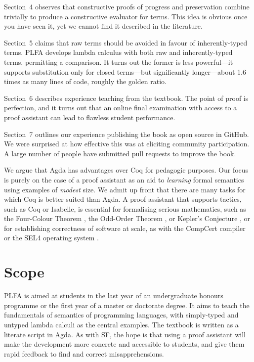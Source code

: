\documentclass[preprint,authoryear]{elsarticle}
\begin{document}
Section~4 observes that constructive proofs of progress and
preservation combine trivially to produce a constructive evaluator for
terms.  This idea is obvious once you have seen it, yet we cannot
find it described in the literature.

Section~5 claims that raw terms should be avoided in favour of
inherently-typed terms.  PLFA develops lambda calculus with both raw
and inherently-typed terms, permitting a comparison.  It turns out the
former is less powerful---it supports substitution only for closed
terms---but significantly longer---about 1.6 times as many lines of code,
roughly the golden ratio.

Section~6 describes experience teaching from the textbook.  The point
of proof is perfection, and it turns out that an online final
examination with access to a proof assistant can lead to flawless
student performance.

Section~7 outlines our experience publishing the book as open source
in GitHub.  We were surprised at how effective this was at eliciting
community participation.  A large number of people have submitted pull
requests to improve the book.

We argue that Agda has advantages over Coq for
pedagogic purposes.  Our focus is purely on the case of a proof assistant
as an aid to \emph{learning} formal semantics using examples of
\emph{modest} size.  We admit up front that
there are many tasks for which Coq is better suited than Agda.
A proof assistant that supports tactics, such as Coq or Isabelle,
is essential for formalising serious mathematics,
such as the Four-Colour Theorem \citep{Gonthier-2008},
the Odd-Order Theorem \citep{Gonthier-et-al-2013},
or Kepler's Conjecture \citep{Hales-et-al-2017},
or for establishing correctness of software at scale,
as with the CompCert compiler \citep{Leroy-2009,Kastner-et-al-2017}
or the SEL4 operating system \citep{Klein-2009,O'Connor-2016}.

\section{Scope}

PLFA is aimed at students in the last year of an undergraduate
honours programme or the first year of a master or doctorate degree.
It aims to teach the fundamentals of semantics of
programming languages, with simply-typed and untyped lambda calculi as the
central examples.  The textbook is written as a literate script in Agda.
As with SF, the hope is that using
a proof assistant will make the development more concrete
and accessible to students, and give them rapid feedback to find
and correct misapprehensions.
\end{document}
